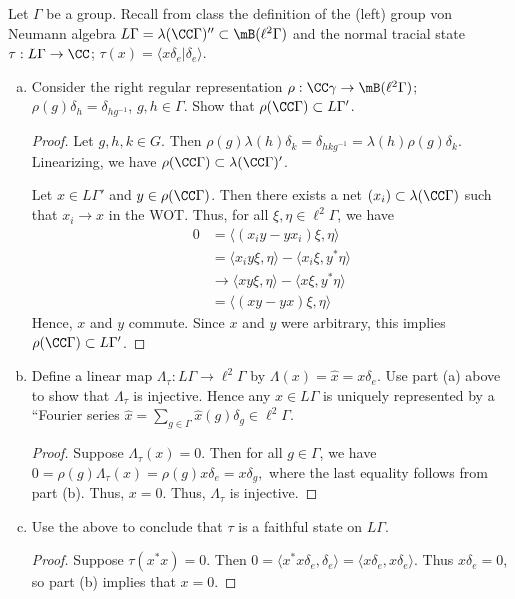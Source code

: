 \documentclass{article}
\begin{document}
 Let $\Gamma$ be a group. Recall from class the definition of the (left) group von Neumann algebra $L\Gamma = \lambda(\CC \Gamma)'' \subset \mB(\ell^2\Gamma)$ and the normal tracial state $\tau : L\Gamma \to \CC$; $\tau(x) = \langle x \delta_e | \delta_e \rangle$.
\begin{enumerate}[(a)]
\item Consider the right regular representation $\rho : \CC \gamma \to \mB(\ell^2\Gamma)$; $\rho(g) \delta_h = \delta_{hg^{-1}}$, $g, h \in \Gamma$. Show that $\rho(\CC \Gamma) \subset L \Gamma'$.
  \begin{proof}
    Let $g,h,k \in G$.  Then $\rho(g) \lambda(h) \delta_k = \delta_{hkg^{-1}} = \lambda(h) \rho(g) \delta_k$.  Linearizing, we have $\rho(\CC \Gamma) \subset \lambda(\CC \Gamma)'$.
    
    Let $x \in L \Gamma'$ and $y \in \rho(\CC \Gamma)$. Then there exists a net $(x_i) \subset \lambda(\CC \Gamma)$ such that $x_i \to x$ in the WOT. Thus, for all $\xi, \eta \in \ell^2 \Gamma$, we have
\begin{align*}
    0 & = \langle (x_i y - y x_i) \xi, \eta \rangle \\
    & =  \langle x_i y \xi, \eta \rangle - \langle x_i \xi, y^* \eta \rangle \\
    & \to  \langle x  y \xi, \eta \rangle - \langle x \xi, y^* \eta \rangle \\ 
    & = \langle (x y - y x) \xi, \eta \rangle
\end{align*}
Hence, $x$ and $y$ commute.  Since $x$ and $y$ were arbitrary, this implies  $\rho(\CC \Gamma) \subset L \Gamma'$.
  \end{proof}
\item Define a linear map $\Lambda_\tau : L \Gamma \to \ell^2 \Gamma$ by $\Lambda(x) = \hat{x} = x \delta_e$. Use part (a) above to show that $\Lambda_\tau$ is injective.  Hence any $x \in L \Gamma$ is uniquely represented by a ``Fourier series $\hat{x} = \sum_{g \in \Gamma} \hat{x}(g) \delta_g \in \ell^2 \Gamma$.
  \begin{proof}
    Suppose $\Lambda_\tau(x) = 0$. Then for all $g \in \Gamma$, we have
    $0 = \rho(g) \Lambda_\tau(x) = \rho(g) x \delta_e = x \delta_g,$ where the
    last equality follows from part (b).  Thus, $x = 0$.  Thus, $\Lambda_\tau$ is injective.
  \end{proof}
\item Use the above to conclude that $\tau$ is a faithful state on $L\Gamma$.
  \begin{proof}
    Suppose $\tau(x^* x) = 0$.  Then $0 = \langle x^* x \delta_e, \delta_e \rangle = \langle x \delta_e, x \delta_e \rangle$.  Thus $x \delta_e = 0$, so part (b) implies that $x = 0$.

\end{proof}
\end{enumerate}
\end{document}
